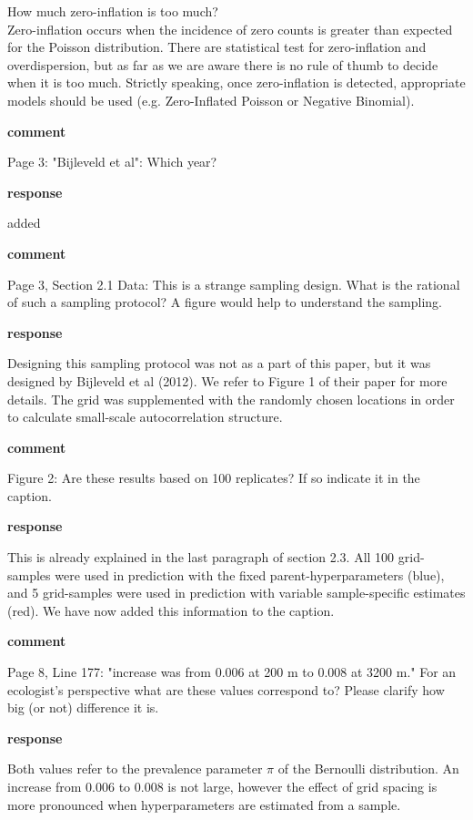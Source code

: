 \documentclass{letter}
\begin{document}
\begin{letter}
How much zero-inflation is too much?\\
Zero-inflation occurs when the incidence of zero counts is greater than expected for the Poisson distribution. 
There are statistical test for zero-inflation and overdispersion, but as far as we are aware there is no rule of thumb to decide when it is too much. Strictly speaking, once zero-inflation is detected, appropriate models should be used (e.g. Zero-Inflated Poisson or Negative Binomial). 

\textbf{comment} 

Page 3: "Bijleveld et al": Which year?

\textbf{response}

added

\textbf{comment} 

Page 3, Section 2.1 Data: This is a strange sampling design. What is the rational of such a sampling protocol? A figure would help to understand the sampling.

\textbf{response}

Designing this sampling protocol was not as a part of this paper, but it was designed by Bijleveld et al (2012). We refer to Figure 1 of their paper for more details. The grid was supplemented with the randomly chosen locations in order to calculate small-scale autocorrelation structure. 

\textbf{comment} 

Figure 2: Are these results based on 100 replicates? If so indicate it in the caption.

\textbf{response}

This is already explained in the last paragraph of section 2.3. All 100 grid-samples were used in prediction with the fixed parent-hyperparameters (blue), and 5 grid-samples were used in prediction with variable sample-specific estimates (red). We have now added this information to the caption.

\textbf{comment} 

Page 8, Line 177: "increase was from 0.006 at 200 m to 0.008 at 3200 m." For an ecologist's perspective what are these values correspond to? Please clarify how big (or not) difference it is.

\textbf{response}

Both values refer to the prevalence parameter $\pi$ of the Bernoulli distribution. An increase from 0.006 to 0.008 is not large, however the effect of grid spacing is more pronounced when hyperparameters are estimated from a sample. 


\end{letter}
\end{document}
